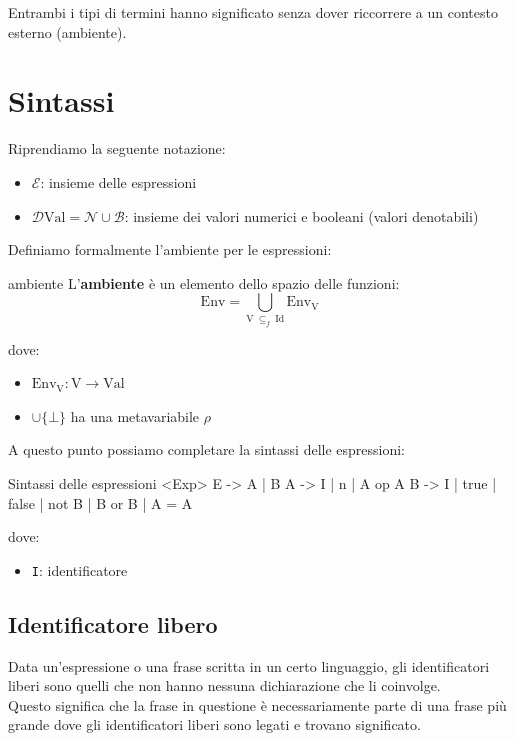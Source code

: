 Entrambi i tipi di termini hanno significato senza dover riccorrere a un contesto esterno (ambiente).

\section{Sintassi}
Riprendiamo la seguente notazione:
\begin{itemize}[label=$\diamond$, itemsep=\smallskipamount]
    \item $\mathcal{E}$: insieme delle espressioni
    \item $\mathcal{D} \mathrm{Val} = \mathcal{N} \cup \mathcal{B}$: insieme dei valori numerici e booleani (valori denotabili)
\end{itemize}

Definiamo formalmente l'ambiente per le espressioni:
\begin{mydef}{ambiente}
    L'\textbf{ambiente} è un elemento dello spazio delle funzioni:
    \[
        \mathrm{Env} = \bigcup\limits_{\mathrm{V} \ \subseteq_{f} \ \mathrm{Id}} \mathrm{Env_V}
    \]

    dove:
    \begin{itemize}[label=$\circ$, itemsep=\smallskipamount]
        \item $\mathrm{Env_V} : \mathrm{V} \rightarrow \mathrm{Val}$
        \item $\cup \{\bot\}$ ha una metavariabile $\rho$
    \end{itemize}
\end{mydef}

A questo punto possiamo completare la sintassi delle espressioni:
\begin{bnfcode}{Sintassi delle espressioni}
    <Exp>
    E -> A | B
    A -> I | n | A op A
    B -> I | true | false | not B | B or B | A = A
\end{bnfcode}

dove:
\begin{itemize}[label=$\triangleright$, itemsep=\smallskipamount]
    \item \texttt{I}: identificatore
\end{itemize}

\subsection{Identificatore libero}
Data un'espressione o una frase scritta in un certo linguaggio, gli identificatori liberi sono quelli che non hanno nessuna dichiarazione che li coinvolge.\\[0.2ex]
Questo significa che la frase in questione è necessariamente parte di una frase più grande dove gli identificatori liberi sono legati e trovano significato.

